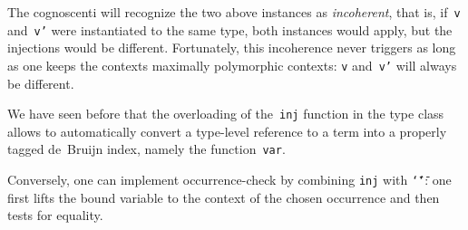 \documentclass[9pt,authoryear]{sigplanconf}
\begin{document}
%
The cognoscenti will recognize the two above instances as
    \emph{incoherent}, that is, if{~}\texttt{v} and{~}\texttt{v{'}} were instantiated
    to the same type, both instances would apply, but the injections would be different. Fortunately,
    this incoherence never triggers as long as one keeps the contexts
    maximally polymorphic contexts{:} \texttt{v} and{~}\texttt{v{'}} will always be
    different.%


%
We have seen before that the overloading of the{~}\texttt{inj} function
    in the type class{~}\texttt{\makebox[1.22ex][c]{$ \in $}} allows to automatically convert a type-level
    reference to a term into a properly tagged de{~}Bruijn index, namely
    the function{~}\texttt{var}.%


%
Conversely, one can implement occurrence-check by combining  \texttt{inj} with \texttt{\makebox[1.22ex][l]{$ {(} $}}\texttt{{\char `\=}{\char `\=}}\texttt{\makebox[1.22ex][r]{$ {)} $}}{:}
    one first lifts the bound variable to the context of the chosen occurrence and
    then tests for equality.%


{\nopagebreak }
\end{document}
